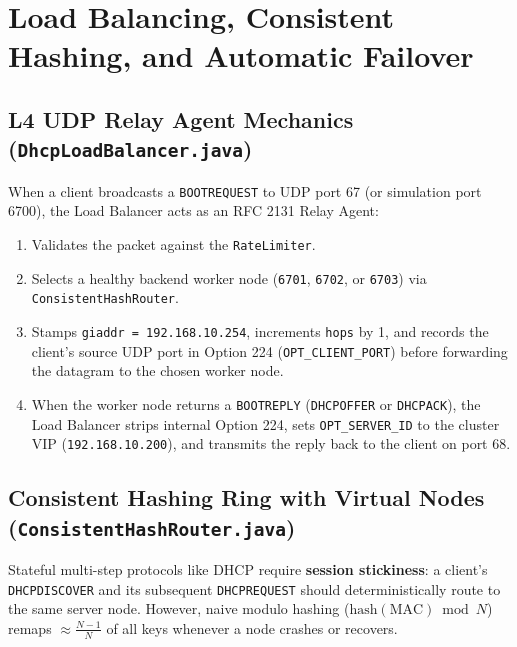 \documentclass[11pt,a4paper]{article}
\begin{document}
\section{Load Balancing, Consistent Hashing, and Automatic Failover}

\subsection{L4 UDP Relay Agent Mechanics (\texttt{DhcpLoadBalancer.java})}
When a client broadcasts a \texttt{BOOTREQUEST} to UDP port 67 (or simulation port 6700), the Load Balancer acts as an RFC 2131 Relay Agent:
\begin{enumerate}[leftmargin=2em]
    \item Validates the packet against the \texttt{RateLimiter}.
    \item Selects a healthy backend worker node (\texttt{6701}, \texttt{6702}, or \texttt{6703}) via \texttt{ConsistentHashRouter}.
    \item Stamps \texttt{giaddr = 192.168.10.254}, increments \texttt{hops} by 1, and records the client's source UDP port in Option 224 (\texttt{OPT\_CLIENT\_PORT}) before forwarding the datagram to the chosen worker node.
    \item When the worker node returns a \texttt{BOOTREPLY} (\texttt{DHCPOFFER} or \texttt{DHCPACK}), the Load Balancer strips internal Option 224, sets \texttt{OPT\_SERVER\_ID} to the cluster VIP (\texttt{192.168.10.200}), and transmits the reply back to the client on port 68.
\end{enumerate}

\subsection{Consistent Hashing Ring with Virtual Nodes (\texttt{ConsistentHashRouter.java})}
Stateful multi-step protocols like DHCP require \textbf{session stickiness}: a client's \texttt{DHCPDISCOVER} and its subsequent \texttt{DHCPREQUEST} should deterministically route to the same server node. However, naive modulo hashing ($\text{hash}(\text{MAC}) \bmod N$) remaps $\approx \frac{N-1}{N}$ of all keys whenever a node crashes or recovers.
\end{document}
